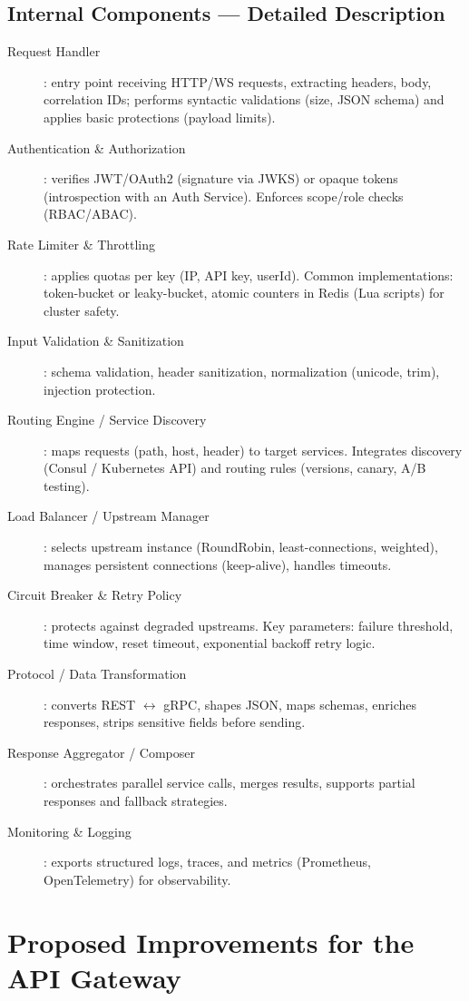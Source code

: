 \documentclass[a4paper,11pt]{article}
\begin{document}
\subsection{Internal Components — Detailed Description}
\begin{description}
  \item[Request Handler] : entry point receiving HTTP/WS requests, extracting headers, body, correlation IDs; performs syntactic validations (size, JSON schema) and applies basic protections (payload limits).
  \item[Authentication \& Authorization] : verifies JWT/OAuth2 (signature via JWKS) or opaque tokens (introspection with an Auth Service). Enforces scope/role checks (RBAC/ABAC).
  \item[Rate Limiter \& Throttling] : applies quotas per key (IP, API key, userId). Common implementations: token-bucket or leaky-bucket, atomic counters in Redis (Lua scripts) for cluster safety.
  \item[Input Validation \& Sanitization] : schema validation, header sanitization, normalization (unicode, trim), injection protection.
  \item[Routing Engine / Service Discovery] : maps requests (path, host, header) to target services. Integrates discovery (Consul / Kubernetes API) and routing rules (versions, canary, A/B testing).
  \item[Load Balancer / Upstream Manager] : selects upstream instance (RoundRobin, least-connections, weighted), manages persistent connections (keep-alive), handles timeouts.
  \item[Circuit Breaker \& Retry Policy] : protects against degraded upstreams. Key parameters: failure threshold, time window, reset timeout, exponential backoff retry logic.
  \item[Protocol / Data Transformation] : converts REST $\leftrightarrow$ gRPC, shapes JSON, maps schemas, enriches responses, strips sensitive fields before sending.
  \item[Response Aggregator / Composer] : orchestrates parallel service calls, merges results, supports partial responses and fallback strategies.
  \item[Monitoring \& Logging] : exports structured logs, traces, and metrics (Prometheus, OpenTelemetry) for observability.
\end{description}

\section{Proposed Improvements for the API Gateway}
\end{document}
